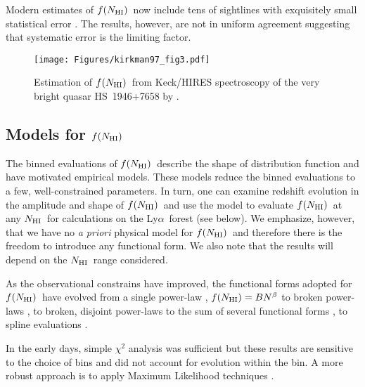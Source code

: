 \documentclass[graybox]{svmult}
\def\lya{Ly$\alpha$}
\newcommand{\mnhi}{N_{\rm HI}}
\newcommand{\nhi}{$\mnhi$}
\def\mfnhi{f(\mnhi)}
\def\fnhi{$\mfnhi$}
\begin{document}
Modern estimates of \fnhi\ now include tens of sightlines
with exquisitely small statistical error \cite{rudie13,kim13}.
The results, however, are not in uniform agreement suggesting
that systematic error is the limiting factor.



%
\begin{figure}[b]
\sidecaption
\texttt{[image: Figures/kirkman97\_fig3.pdf]}
%
%
\caption{Estimation of \fnhi\ from Keck/HIRES spectroscopy of the
very bright quasar HS~1946+7658 by \cite{kt97}.
}
\label{fig:fN_kt97}       %
\end{figure}

\subsection{Models for \fnhi}

The binned evaluations of \fnhi\ describe the shape of 
distribution function and have motivated empirical
models. These models reduce the binned evaluations to a few, 
well-constrained parameters.  In turn, one can
examine redshift evolution in the amplitude and shape
of \fnhi\ and use the model to evaluate \fnhi\ at 
any \nhi\ for calculations on the \lya\ forest (see below).
We emphasize, however, that we have no {\it a priori}
physical model for \fnhi\ and therefore there is the
freedom to introduce any functional form.
We also note that the results will depend
on the \nhi\ range considered. 

As the observational constrains have improved, the
functional forms adopted for \fnhi\ have evolved from
a single power-law \cite{tytler87},
$\mfnhi = B N^\beta$
to broken power-laws \cite{petit93,pow10},
to broken, disjoint power-laws \cite{rudie13} 
to the sum of several functional forms \cite{inoue+14},
to spline evaluations \cite{pro+14}.

In the early days, simple $\chi^2$ analysis
was sufficient but these results
are sensitive to the choice of bins and did
not account for evolution within the bin.
A more robust approach is to apply Maximum
Likelihood techniques \cite{sim96,ctp+10}.
\end{document}
